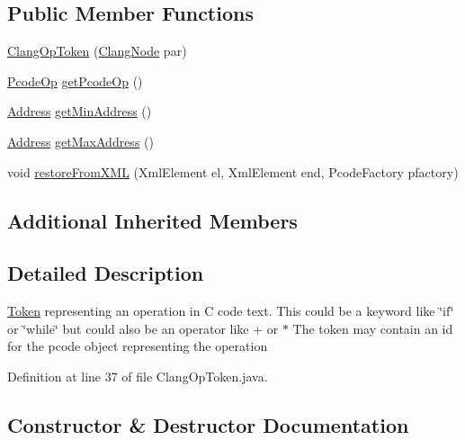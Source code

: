 \subsection*{Public Member Functions}
\begin{DoxyCompactItemize}
\item 
\mbox{\hyperlink{classghidra_1_1app_1_1decompiler_1_1_clang_op_token_a91436b2a0b7fddcf42aefce6963dffaf}{Clang\+Op\+Token}} (\mbox{\hyperlink{interfaceghidra_1_1app_1_1decompiler_1_1_clang_node}{Clang\+Node}} par)
\item 
\mbox{\hyperlink{class_pcode_op}{Pcode\+Op}} \mbox{\hyperlink{classghidra_1_1app_1_1decompiler_1_1_clang_op_token_a2467a7ba806e376b9a8c041e9d16cf41}{get\+Pcode\+Op}} ()
\item 
\mbox{\hyperlink{class_address}{Address}} \mbox{\hyperlink{classghidra_1_1app_1_1decompiler_1_1_clang_op_token_ac5caf9ff72e305f37b06aa5228e176e4}{get\+Min\+Address}} ()
\item 
\mbox{\hyperlink{class_address}{Address}} \mbox{\hyperlink{classghidra_1_1app_1_1decompiler_1_1_clang_op_token_a843c0db9334c599560d97afaecbf62e1}{get\+Max\+Address}} ()
\item 
void \mbox{\hyperlink{classghidra_1_1app_1_1decompiler_1_1_clang_op_token_a510c9a39313930b1a7fa84d76cdeb34a}{restore\+From\+X\+ML}} (Xml\+Element el, Xml\+Element end, Pcode\+Factory pfactory)
\end{DoxyCompactItemize}
\subsection*{Additional Inherited Members}


\subsection{Detailed Description}
\mbox{\hyperlink{class_token}{Token}} representing an operation in C code text. This could be a keyword like \char`\"{}if\char`\"{} or \char`\"{}while\char`\"{} but could also be an operator like \textquotesingle{}+\textquotesingle{} or \textquotesingle{}$\ast$\textquotesingle{} The token may contain an id for the pcode object representing the operation 

Definition at line 37 of file Clang\+Op\+Token.\+java.



\subsection{Constructor \& Destructor Documentation}
\mbox{\label{classghidra_1_1app_1_1decompiler_1_1_clang_op_token_a91436b2a0b7fddcf42aefce6963dffaf}} 

